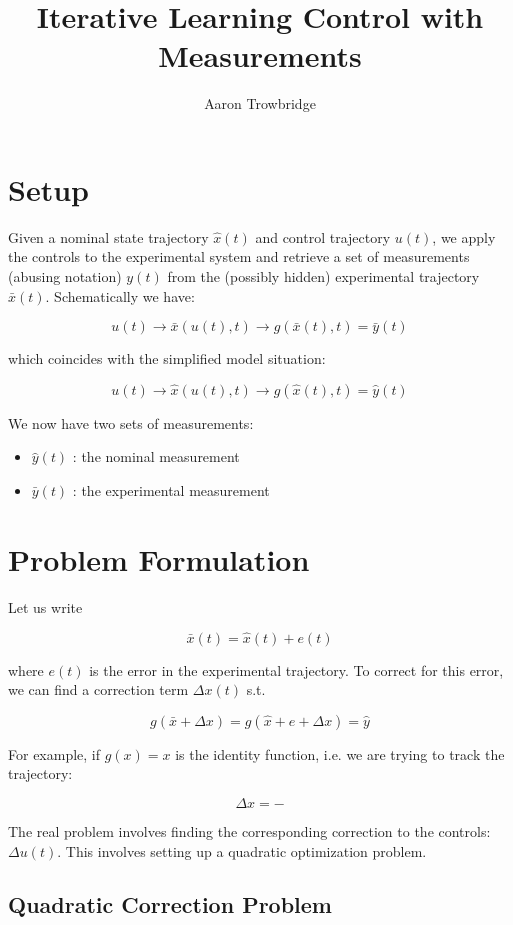 \documentclass{article}
\title{Iterative Learning Control with Measurements}
\author{Aaron Trowbridge}
\date{}
\begin{document}
\maketitle

\section*{Setup}

Given a nominal state trajectory $\hat{x}(t)$ and control trajectory $u(t)$, we apply the controls to the experimental system and retrieve a set of measurements (abusing notation) $y(t)$ from the (possibly hidden) experimental trajectory $\bar x (t)$. Schematically we have:

$$
u(t) \longrightarrow \bar x (u(t), t) \longrightarrow g(\bar x(t), t) = \bar y(t)
$$

 
which coincides with the simplified model situation:

$$
u(t) \longrightarrow \hat x (u(t), t) \longrightarrow g(\hat x(t), t) = \hat y(t)
$$


We now have two sets of measurements: 

\begin{itemize}
  \item $\hat y(t)$ : the nominal measurement
  \item $\bar y(t)$ : the experimental measurement
\end{itemize}

\section*{Problem Formulation}

Let us write

$$
\bar x (t) = \hat x (t) + e(t)
$$


where $e(t)$ is the error in the experimental trajectory.  To correct for this error, we can find a correction term $\Delta x(t)$ s.t.

$$
g(\bar x + \Delta x) = g(\hat x + e + \Delta x ) = \hat y
$$

For example, if $g(x) = x$ is the identity function, i.e. we are trying to track the trajectory:

$$
\Delta x = - 
$$

The real problem involves finding the corresponding correction to the controls: $\Delta u(t)$. This involves setting up a quadratic optimization problem.

\newpage
\subsection*{Quadratic Correction Problem}
\end{document}
